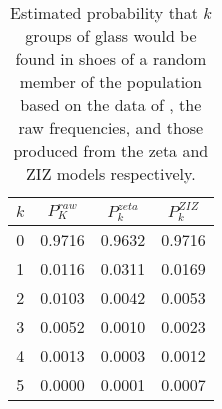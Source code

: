 \documentclass{article}\usepackage[]{graphicx}\usepackage[]{xcolor}
\begin{document}
\begin{table}[ht]
\centering
\begin{tabular}{cccc}
  \hline
$k$ & $P_K^{raw}$ & $P_k^{zeta}$ & $P_k^{ZIZ}$ \\ 
  \hline
0 & 0.9716 & 0.9632 & 0.9716 \\ 
  1 & 0.0116 & 0.0311 & 0.0169 \\ 
  2 & 0.0103 & 0.0042 & 0.0053 \\ 
  3 & 0.0052 & 0.0010 & 0.0023 \\ 
  4 & 0.0013 & 0.0003 & 0.0012 \\ 
  5 & 0.0000 & 0.0001 & 0.0007 \\ 
   \hline
\end{tabular}
\caption{Estimated probability that $k$ groups of glass would be found in shoes of a random member of the population based on the data of \citep{roux2001}, the raw frequencies, and those produced from the zeta and ZIZ models respectively.} 
\label{tab:ex1}
\end{table}
\end{document}

